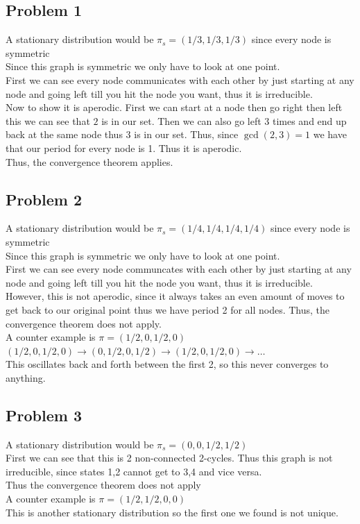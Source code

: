 \documentclass[12pt, letterpaper]{article}
\theoremstyle{definition}
\begin{document}
\pagestyle{fancy}
\fancyhf{}
\fancyhead[ROE]{\thepage}

\subsection*{Problem 1}
A stationary distribution would be $\pi_s = \left( 1/3,1/3,1/3 \right)$ since every node is symmetric\\
Since this graph is symmetric we only have to look at one point.\\
First we can see every node communicates with each other by just starting at any node and going left till you hit the node you want, thus it is irreducible.\\
Now to show it is aperodic. First we can start at a node then go right then left this we can see that $2$ is in our set. Then we can also go left 3 times and end up back at the same node thus 3 is in our set. Thus, since $\gcd(2,3)=1$ we have that our period for every node is 1. Thus it is aperodic.\\
Thus, the convergence theorem applies.

\newpage
\subsection*{Problem 2}
A stationary distribution would be $\pi_s = \left( 1/4,1/4,1/4,1/4 \right)$ since every node is symmetric\\
Since this graph is symmetric we only have to look at one point.\\
First we can see every node communcates with each other by just starting at any node and going left till you hit the node you want, thus it is irreducible.\\
However, this is not aperodic, since it always takes an even amount of moves to get back to our original point thus we have period 2 for all nodes. Thus, the convergence theorem does not apply.\\
A counter example is $\pi=\left( 1/2,0,1/2,0 \right)$\\
$\left( 1/2,0,1/2,0 \right) \rightarrow \left( 0,1/2,0,1/2 \right) \rightarrow \left( 1/2,0,1/2,0 \right) \rightarrow \dots$\\
This oscillates back and forth between the first 2, so this never converges to anything.

\newpage
\subsection*{Problem 3}
A stationary distribution would be $\pi_s = \left( 0,0,1/2,1/2 \right)$\\
First we can see that this is 2 non-connected 2-cycles. Thus this graph is not irreducible, since states 1,2 cannot get to 3,4 and vice versa.\\
Thus the convergence theorem does not apply\\
A counter example is $\pi=\left( 1/2,1/2,0,0 \right)$\\
This is another stationary distribution so the first one we found is not unique.
\end{document}
